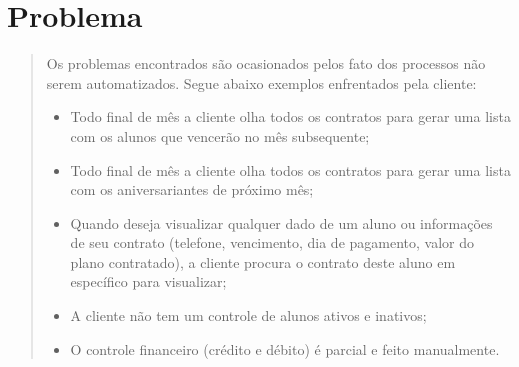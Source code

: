 \section[Problema]{Problema}
\begin{quote} Os problemas encontrados são ocasionados pelos fato dos processos não serem automatizados. Segue abaixo exemplos enfrentados pela cliente:
    \begin{itemize}
        \item Todo final de mês a cliente olha todos os contratos para gerar uma lista com os alunos que vencerão no mês subsequente;
		\item Todo final de mês a cliente olha todos os contratos para gerar uma lista com os aniversariantes de próximo mês;
		\item Quando deseja visualizar qualquer dado de um aluno ou informações de seu contrato (telefone, vencimento, dia de pagamento, valor do plano contratado), a cliente procura o contrato deste aluno em específico para visualizar;
		\item A cliente não tem um controle de alunos ativos e inativos;
		\item O controle financeiro (crédito e débito) é parcial e feito manualmente.
    \end{itemize}
\end{quote}